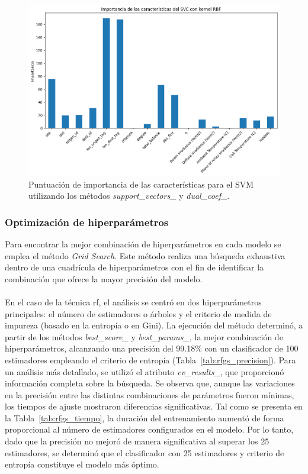 \begin{figure}[H]
  \centering
  \includegraphics[width=\textwidth]{fig/06_fault_sg/fault_sg_11.png}
  \caption{Puntuación de importancia de las características para el SVM utilizando los métodos \textit{support\_vectors\_} y  \textit{dual\_coef\_}.}
  \label{fig:fault_sg_11}
\end{figure}


\subsubsection{Optimización de hiperparámetros}

Para encontrar la mejor combinación de hiperparámetros en cada modelo se emplea el método \textit{Grid Search}. Este método realiza una búsqueda exhaustiva dentro de una cuadrícula de hiperparámetros con el fin de identificar la combinación que ofrece la mayor precisión del modelo.\\
\\
En el caso de la técnica \gls{rf}, el análisis se centró en dos hiperparámetros principales: el número de estimadores o árboles y el criterio de medida de impureza (basado en la entropía o en Gini). La ejecución del método determinó, a partir de los métodos \textit{best\_score\_} y \textit{best\_params\_}, la mejor combinación de hiperparámetros, alcanzando una precisión del 99.18\% con un clasificador de 100 estimadores empleando el criterio de entropía (Tabla~\ref{tab:rfgs_precision}). Para un análisis más detallado, se utilizó el atributo \textit{cv\_results\_}, que proporcionó información completa sobre la búsqueda. Se observa que, aunque las variaciones en la precisión entre las distintas combinaciones de parámetros fueron mínimas, los tiempos de ajuste mostraron diferencias significativas. Tal como se presenta en la Tabla~\ref{tab:rfgs_tiempo}, la duración del entrenamiento aumentó de forma proporcional al número de estimadores configurados en el modelo. Por lo tanto, dado que la precisión no mejoró de manera significativa al superar los 25 estimadores, se determinó que el clasificador con 25 estimadores y criterio de entropía constituye el modelo más óptimo.

